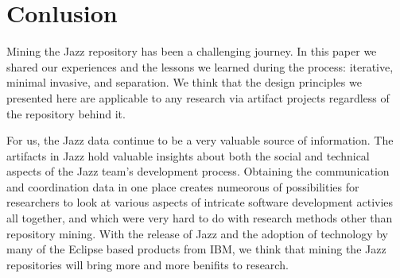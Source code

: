 \section{Conlusion}
Mining the Jazz repository has been a challenging journey. In
this paper we shared our experiences and the lessons we learned during the
process: iterative, minimal invasive, and separation. We think that the design principles we presented here
are applicable to any research via artifact projects regardless of the repository
behind it.

For us, the Jazz data continue to be a very valuable source of information. The
artifacts in Jazz hold valuable insights about both the social and technical
aspects of the Jazz team's development process. Obtaining the communication and
coordination data in one place creates numeorous of possibilities for researchers
to look at various aspects of intricate software development activies all
together, and which were very hard to do with research methods other than
repository mining. With the release of Jazz and the adoption of technology by
many of the Eclipse based products from IBM, we think that mining the Jazz
repositories will bring more and more benifits to research.
